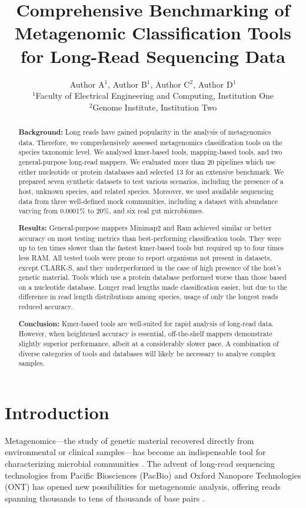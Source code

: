 \documentclass{article}
\title{Comprehensive Benchmarking of Metagenomic Classification Tools for Long-Read Sequencing Data}
\author{
Author A$^{1}$, Author B$^{1}$, Author C$^{2}$, Author D$^{1}$ \\
$^{1}$Faculty of Electrical Engineering and Computing, Institution One \\
$^{2}$Genome Institute, Institution Two
}
\date{}
\begin{document}
\maketitle

\begin{abstract}
\textbf{Background:} Long reads have gained popularity in the analysis of metagenomics data. Therefore, we comprehensively assessed metagenomics classification tools on the species taxonomic level. We analysed kmer-based tools, mapping-based tools, and two general-purpose long-read mappers. We evaluated more than 20 pipelines which use either nucleotide or protein databases and selected 13 for an extensive benchmark. We prepared seven synthetic datasets to test various scenarios, including the presence of a host, unknown species, and related species. Moreover, we used available sequencing data from three well-defined mock communities, including a dataset with abundance varying from 0.0001\% to 20\%, and six real gut microbiomes.

\textbf{Results:} General-purpose mappers Minimap2 and Ram achieved similar or better accuracy on most testing metrics than best-performing classification tools. They were up to ten times slower than the fastest kmer-based tools but required up to four times less RAM. All tested tools were prone to report organisms not present in datasets, except CLARK-S, and they underperformed in the case of high presence of the host's genetic material. Tools which use a protein database performed worse than those based on a nucleotide database. Longer read lengths made classification easier, but due to the difference in read length distributions among species, usage of only the longest reads reduced accuracy.

\textbf{Conclusion:} Kmer-based tools are well-suited for rapid analysis of long-read data. However, when heightened accuracy is essential, off-the-shelf mappers demonstrate slightly superior performance, albeit at a considerably slower pace. A combination of diverse categories of tools and databases will likely be necessary to analyse complex samples.
\end{abstract}

\section{Introduction}

Metagenomics---the study of genetic material recovered directly from environmental or clinical samples---has become an indispensable tool for characterizing microbial communities \citep{quince2017shotgun, mcfall2013animals, kuczynski2009microbial}. The advent of long-read sequencing technologies from Pacific Biosciences (PacBio) and Oxford Nanopore Technologies (ONT) has opened new possibilities for metagenomic analysis, offering reads spanning thousands to tens of thousands of base pairs \citep{bickhart2019hybrid, wenger2022short, govender2022finding, tedersoo2020testing, nicholls2019ultra, leidenfrost2020benchmarking}.
\end{document}
